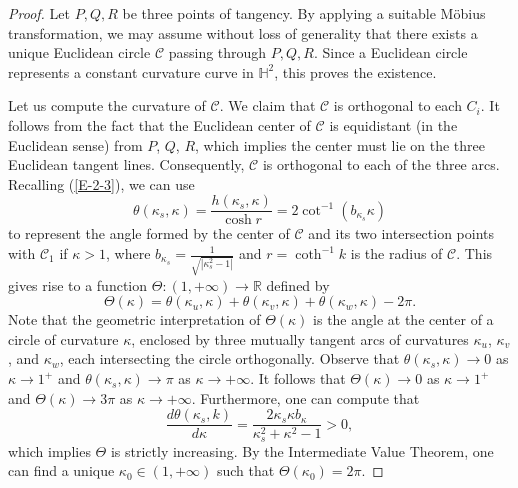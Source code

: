 \documentclass[11pt,leqno]{article}
\numberwithin{equation}{section}
\theoremstyle{definition}
\begin{document}
\begin{proof}
Let \(P, Q, R\) be three points of tangency. By applying a suitable M\"obius transformation, we may assume without loss of generality that there exists a unique Euclidean circle \(\mathcal{C}\) passing through  \(P, Q, R\). Since a Euclidean circle represents a constant curvature curve in \(\mathbb{H}^2\), this proves the existence.

Let us compute the curvature of $\mathcal C$. We claim that $\mathcal C$ is orthogonal to each $C_i$. It follows from the fact that the Euclidean center of $\mathcal C$ is equidistant (in the Euclidean sense) from $P$, $Q$, $R$, which implies the center must lie on the three Euclidean tangent lines. Consequently, \( \mathcal{C} \) is orthogonal to each of the three arcs.
Recalling (\ref{E-2-3}), we can use
\begin{equation}\label{E-3-7}\theta(\kappa_s,\kappa)=\frac{h(\kappa_s,\kappa)}{\cosh r}=2\cot^{-1}(b_{\kappa_s}\kappa)\end{equation}
to represent the angle formed by the center of $\mathcal C$  and its two intersection points with $\mathcal C_1$ if $\kappa>1$, where $b_{\kappa_s}=\frac{1}{\sqrt{|\kappa_s^2-1|}}$ and $r=\coth^{-1}k$ is the radius of $\mathcal C$. This gives rise to a function $\Theta:(1,+\infty)\to\mathbb{R}$ defined by
\[\Theta(\kappa)=\theta(\kappa_u,\kappa)+\theta(\kappa_v,\kappa)+\theta(\kappa_w,\kappa)-2\pi.\]
Note that the geometric interpretation of $\Theta(\kappa)$ is the angle at the center of a circle of curvature $\kappa$, enclosed by three mutually tangent arcs of curvatures $\kappa_u$, $\kappa_v$, and $\kappa_w$, each intersecting the circle orthogonally.
Observe that $\theta(\kappa_s,\kappa)\to0$ as $\kappa\to1^+$ and $\theta(\kappa_s,\kappa)\to\pi$ as $\kappa\to+\infty$. It follows that $\Theta(\kappa)\to0$ as $\kappa\to1^+$ and $\Theta(\kappa)\to3\pi$ as $\kappa\to+\infty$. Furthermore, one can compute that
\begin{equation}\label{E-2-8}\frac{d\theta(\kappa_s,k)}{d\kappa}=\frac{2\kappa_s\kappa b_{\kappa}}{\kappa_s^2+\kappa^2-1}>0,\end{equation}
which implies $\Theta$ is strictly increasing.
By the Intermediate Value Theorem, one can find a unique $\kappa_0\in(1,+\infty)$ such that $\Theta(\kappa_0)=2\pi$.




\end{proof}
\end{document}
